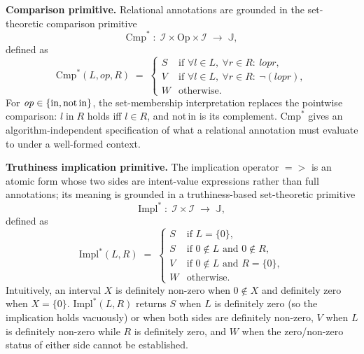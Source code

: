 \documentclass[pdflatex,sn-basic]{sn-jnl}%
\theoremstyle{thmstyleone}%
\theoremstyle{thmstyletwo}%
\theoremstyle{thmstylethree}%
\begin{document}
\smallskip
\noindent\textbf{Comparison primitive.}
Relational annotations are grounded in the set-theoretic comparison primitive
\[
\text{Cmp}^* \;:\; \mathcal{I} \times \text{Op} \times \mathcal{I} \;\to\; \mathbb{J},
\]
defined as
\[
\text{Cmp}^*(L, \mathit{op}, R) \;=\;
\begin{cases}
S & \text{if } \forall l \in L,\ \forall r \in R :\ l \mathrel{\mathit{op}} r, \\[2pt]
V & \text{if } \forall l \in L,\ \forall r \in R :\ \neg(l \mathrel{\mathit{op}} r), \\[2pt]
W & \text{otherwise.}
\end{cases}
\]
For $\mathit{op} \in \{\text{in}, \text{not\,in}\}$, the set-membership interpretation replaces the pointwise comparison: $l \mathrel{\text{in}} R$ holds iff $l \in R$, and not\,in is its complement.
$\text{Cmp}^*$ gives an algorithm-independent specification of what a relational annotation must evaluate to under a well-formed context.

\smallskip
\noindent\textbf{Truthiness implication primitive.}
The implication operator ${=}{>}$ is an atomic form whose two sides are intent-value expressions rather than full annotations; its meaning is grounded in a truthiness-based set-theoretic primitive
\[
\text{Impl}^* \;:\; \mathcal{I} \times \mathcal{I} \;\to\; \mathbb{J},
\]
defined as
\[
\text{Impl}^*(L, R) \;=\;
\begin{cases}
S & \text{if } L = \{0\}, \\[2pt]
S & \text{if } 0 \notin L \text{ and } 0 \notin R, \\[2pt]
V & \text{if } 0 \notin L \text{ and } R = \{0\}, \\[2pt]
W & \text{otherwise.}
\end{cases}
\]
Intuitively, an interval $X$ is definitely non-zero when $0 \notin X$ and definitely zero when $X = \{0\}$.
$\text{Impl}^*(L, R)$ returns $S$ when $L$ is definitely zero (so the implication holds vacuously) or when both sides are definitely non-zero, $V$ when $L$ is definitely non-zero while $R$ is definitely zero, and $W$ when the zero/non-zero status of either side cannot be established.
\end{document}
